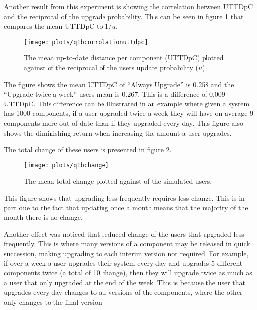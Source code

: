 Another result from this experiment is showing the correlation between UTTDpC and the reciprocal of the upgrade probability.
This can be seen in figure \ref{exp.q1bcorrolationuttdpc} that compares the mean UTTDpC to $1/u$.

\begin{figure}[htp]
\begin{center}
  \texttt{[image: plots/q1bcorrolationuttdpc]}
  \caption{The mean up-to-date distance per component (UTTDpC) plotted against of the reciprocal of the users update probability ($u$)}
  \label{exp.q1bcorrolationuttdpc}
\end{center}
\end{figure}

The figure shows the mean UTTDpC of ``Always Upgrade'' is 0.258 and the ``Upgrade twice a week'' users mean is 0.267.
This is a difference of 0.009 UTTDpC.
This difference can be illustrated in an example where given a system has 1000 components, 
if a user upgraded twice a week they will have on average 9 components more out-of-date than if they upgraded every day. 
This figure also shows the diminishing return when increasing the amount a user upgrades.

The total change of these users is presented in figure \ref{exp.q1bchange}.

\begin{figure}[htp]
\begin{center}
  \texttt{[image: plots/q1bchange]}
  \caption{The mean total change plotted against of the simulated users.}
  \label{exp.q1bchange}
\end{center}
\end{figure}

This figure shows that upgrading less frequently requires less change. 
This is in part due to the fact that updating once a month means that the majority of the month there is no change.

Another effect was noticed that reduced change of the users that upgraded less frequently.
This is where many versions of a component may be released in quick succession, making upgrading to each interim version not required.
For example, if over a week a user upgrades their system every day and upgrades 5 different components twice (a total of 10 change), 
then they will upgrade twice as much as a user that only upgraded at the end of the week.
This is because the user that upgrades every day changes to all versions of the components, where the other only changes to the final version.

